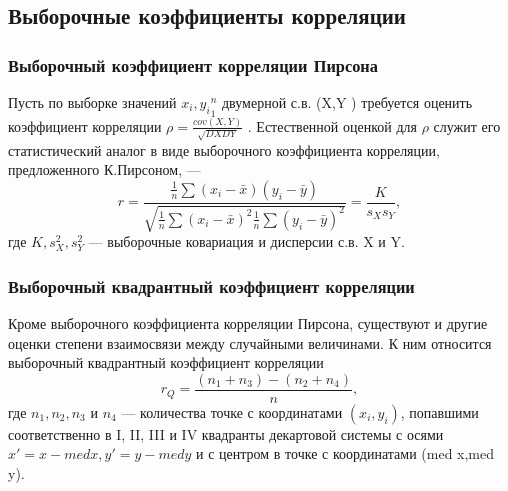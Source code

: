 \documentclass[12pt,a4paper]{scrartcl}
\begin{document}
	\subsection{Выборочные коэффициенты корреляции}
	\subsubsection{Выборочный коэффициент корреляции Пирсона}
	Пусть по выборке значений ${x_{i},y_{i}}^{n}_{1}$ двумерной с.в. (X,Y ) требуется оценить коэффициент корреляции $\rho = \frac{cov(X,Y)}{\sqrt{DXDY}}$ . Естественной оценкой для $\rho$ служит его статистический аналог в виде выборочного коэффициента корреляции, предложенного К.Пирсоном, —
	\begin{equation}
	    r = \frac{
	    \frac{1}{n}\sum{(x_{i} - \bar{x})(y_{i}-\bar{y})}
	    }{
	    \sqrt{\frac{1}{n}\sum{(x_{i} - \bar{x})^{2}}\frac{1}{n}\sum{(y_{i} - \bar{y})^{2}}}
	    }=\frac{K}{s_{X}s_{Y}},
	    \label{r}
	\end{equation}
	где $K,s^{2}_{X},s^{2}_{Y}$ — выборочные ковариация и дисперсии с.в. X и Y.


    \subsubsection{Выборочный квадрантный коэффициент корреляции}
    Кроме выборочного коэффициента корреляции Пирсона, существуют и другие оценки степени взаимосвязи между случайными величинами. К ним относится выборочный квадрантный коэффициент корреляции
    \begin{equation}
        r_{Q} = \frac{(n_{1} + n_{3}) - (n_{2} + n_{4})}{n},
        \label{rQ}
    \end{equation}
    где $n_{1}, n_{2},n_{3}$ и $n_{4}$ — количества точке с координатами $(x_{i},y_{i})$, попавшими соответственно в I, II, III и IV квадранты декартовой системы с осями $x' = x-med x, y' = y- med y $ и с центром в точке с координатами (med x,med y).


	  
\end{document}
